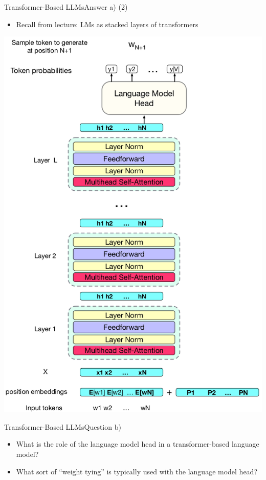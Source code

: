 \documentclass[t]{beamer}
\begin{document}
\begin{frame}{Transformer-Based LLMs}{Answer a) (2)}
    \begin{itemize}
        \item Recall from lecture: LMs as stacked layers of transformers
    \end{itemize}
    \begin{center}
        \includegraphics[scale=0.2]{img/stacked_transformers.png}
    \end{center}
\end{frame}

\begin{frame}{Transformer-Based LLMs}{Question b)}
    \begin{itemize}
        \item What is the role of the language model head in a transformer-based
              language model?
        \item What sort of ``weight tying'' is typically used with the language
              model head?
    \end{itemize}
\end{frame}
\end{document}
